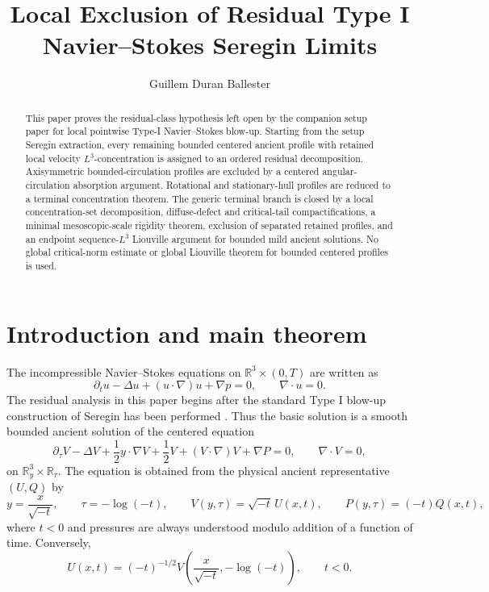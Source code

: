 \documentclass[11pt]{amsart}
\title[Residual Type I Seregin limit exclusion]
{Local Exclusion of Residual Type I Navier--Stokes Seregin Limits}
\author{Guillem Duran Ballester}
\date{}
\numberwithin{equation}{section}
\theoremstyle{plain}
\theoremstyle{definition}
\theoremstyle{remark}
\newcommand{\R}{\mathbb R}
\begin{document}
\raggedbottom

\begin{abstract}
This paper proves the residual-class hypothesis left open by the companion
setup paper for local pointwise Type-I Navier--Stokes blow-up.  Starting from
the setup Seregin extraction, every remaining bounded centered ancient profile
with retained local velocity \(L^3\)-concentration is assigned to an ordered
residual decomposition.  Axisymmetric bounded-circulation profiles are excluded
by a centered angular-circulation absorption argument.  Rotational and
stationary-hull profiles are reduced to a terminal concentration theorem.  The
generic terminal branch is closed by a local concentration-set decomposition,
diffuse-defect and critical-tail compactifications, a minimal mesoscopic-scale
rigidity theorem, exclusion of separated retained profiles, and an endpoint
sequence-\(L^3\) Liouville argument for bounded mild ancient solutions.  No
global critical-norm estimate or global Liouville theorem for bounded centered
profiles is used.
\end{abstract}

\maketitle
\tableofcontents

\section{Introduction and main theorem}
\label{sec:introduction}

The incompressible Navier--Stokes equations on
\(\R^3\times(0,T)\) are written as
\begin{equation}\label{eq:NS-physical}
   \partial_tu-\Delta u+(u\cdot\nabla)u+\nabla p=0,
   \qquad \nabla\cdot u=0 .
\end{equation}
The residual analysis in this paper begins after the standard Type I blow-up
construction of Seregin has been performed \cite{Seregin2012}.  Thus the basic solution is a smooth bounded
ancient solution of the centered equation
\begin{equation}\label{eq:centered-main}
   \partial_\tau V-\Delta V+\frac12 y\cdot\nabla V+\frac12 V
   +(V\cdot\nabla)V+\nabla P=0,
   \qquad \nabla\cdot V=0 ,
\end{equation}
on \(\R^3_y\times\R_\tau\).  The equation is obtained from the physical
ancient representative \((U,Q)\) by
\begin{equation}\label{eq:centered-transform}
   y=\frac{x}{\sqrt{-t}},\qquad
   \tau=-\log(-t),\qquad
   V(y,\tau)=\sqrt{-t}\,U(x,t),
   \qquad
   P(y,\tau)=(-t)Q(x,t),
\end{equation}
where \(t<0\) and pressures are always understood modulo addition of a
function of time.  Conversely,
\begin{equation}\label{eq:physical-pullback-main}
   U(x,t)=(-t)^{-1/2}
   V\!\left(\frac{x}{\sqrt{-t}},-\log(-t)\right),
   \qquad t<0 .
\end{equation}
\end{document}
